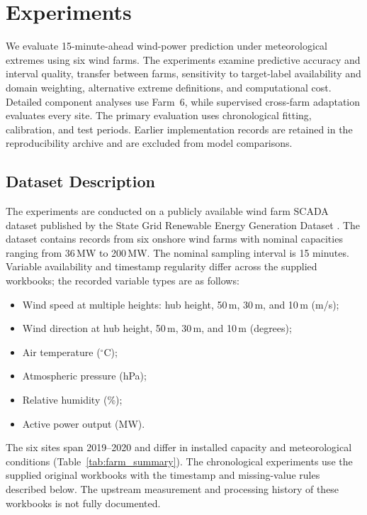 \section{Experiments}\label{Experiments}

{\color{blue}We evaluate 15-minute-ahead wind-power prediction under meteorological extremes using six wind farms. The experiments examine predictive accuracy and interval quality, transfer between farms, sensitivity to target-label availability and domain weighting, alternative extreme definitions, and computational cost. Detailed component analyses use Farm~6, while supervised cross-farm adaptation evaluates every site. The primary evaluation uses chronological fitting, calibration, and test periods. Earlier implementation records are retained in the reproducibility archive and are excluded from model comparisons.}

\subsection{Dataset Description}\label{sec:data}

The experiments are conducted on a publicly available wind farm SCADA dataset published by the State Grid Renewable Energy Generation Dataset \citep{s41597-022-01696-6}. The dataset contains records from six onshore wind farms with nominal capacities ranging from 36\,MW to 200\,MW. {\color{blue}The nominal sampling interval is 15 minutes. Variable availability and timestamp regularity differ across the supplied workbooks; the recorded variable types are as follows:}

\begin{itemize}
    \item Wind speed at multiple heights: hub height, 50\,m, 30\,m, and 10\,m (m/s);
    \item {\color{blue}Wind direction at hub height, 50\,m, 30\,m, and 10\,m (degrees);}
    \item Air temperature ($^\circ$C);
    \item Atmospheric pressure (hPa);
    \item Relative humidity (\%);
    \item Active power output (MW).
\end{itemize}

{\color{blue}The six sites span 2019--2020 and differ in installed capacity and meteorological conditions (Table~\ref{tab:farm_summary}). The chronological experiments use the supplied original workbooks with the timestamp and missing-value rules described below. The upstream measurement and processing history of these workbooks is not fully documented.}

